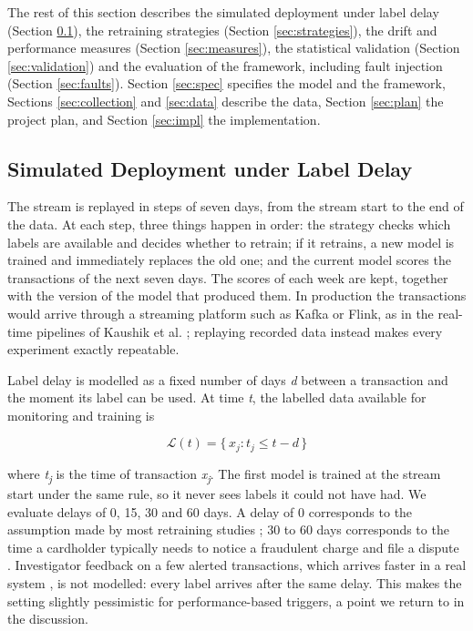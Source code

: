The rest of this section describes the simulated deployment under label delay (Section \ref{sec:deploy}), the retraining strategies (Section \ref{sec:strategies}), the drift and performance measures (Section \ref{sec:measures}), the statistical validation (Section \ref{sec:validation}) and the evaluation of the framework, including fault injection (Section \ref{sec:faults}). Section \ref{sec:spec} specifies the model and the framework, Sections \ref{sec:collection} and \ref{sec:data} describe the data, Section \ref{sec:plan} the project plan, and Section \ref{sec:impl} the implementation.

\subsection{Simulated Deployment under Label Delay}\label{sec:deploy}

The stream is replayed in steps of seven days, from the stream start to the end of the data. At each step, three things happen in order: the strategy checks which labels are available and decides whether to retrain; if it retrains, a new model is trained and immediately replaces the old one; and the current model scores the transactions of the next seven days. The scores of each week are kept, together with the version of the model that produced them. In production the transactions would arrive through a streaming platform such as Kafka or Flink, as in the real-time pipelines of Kaushik et al. \cite{kaushik2025}; replaying recorded data instead makes every experiment exactly repeatable.

Label delay is modelled as a fixed number of days \textit{d} between a transaction and the moment its label can be used. At time \textit{t}, the labelled data available for monitoring and training is

\begin{equation}
  \mathcal{L}(t) = \{\, x_j : t_j \le t - d \,\}
  \label{eq:labelled}
\end{equation}

where \textit{t\textsubscript{j}} is the time of transaction \textit{x\textsubscript{j}}. The first model is trained at the stream start under the same rule, so it never sees labels it could not have had. We evaluate delays of 0, 15, 30 and 60 days. A delay of 0 corresponds to the assumption made by most retraining studies \cite{yelleti2025,wong2025}; 30 to 60 days corresponds to the time a cardholder typically needs to notice a fraudulent charge and file a dispute \cite{dalpozzolo2018}. Investigator feedback on a few alerted transactions, which arrives faster in a real system \cite{dalpozzolo2018}, is not modelled: every label arrives after the same delay. This makes the setting slightly pessimistic for performance-based triggers, a point we return to in the discussion.

